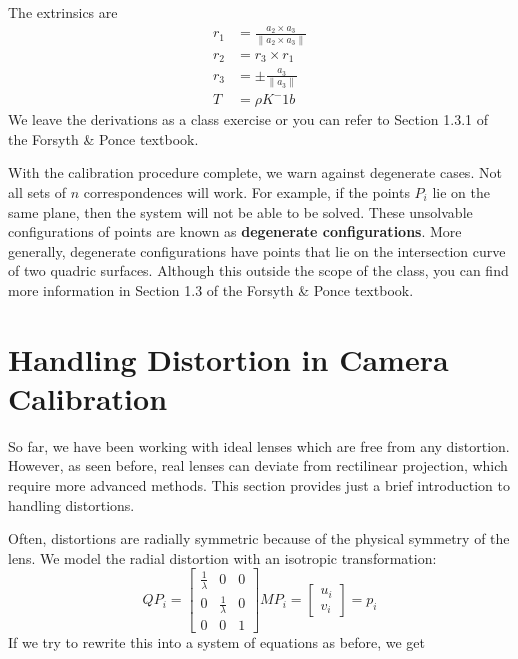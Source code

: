 \documentclass[a4paper, 12pt]{article}
\renewcommand\emph{\textbf}
\begin{document}
The extrinsics are 
\begin{equation}\begin{aligned}
    r_1 &= \frac{a_2\times a_3}{\|a_2\times a_3\|}\\
    r_2 &= r_3\times r_1\\
    r_3 &= \pm \frac{ a_3}{\| a_3\|}\\
    T &= \rho K^-1 b
\end{aligned}\end{equation}
We leave the derivations as a class exercise or you can refer to Section 1.3.1 of the Forsyth \& Ponce textbook.

With the calibration procedure complete, we warn against degenerate cases. Not all sets of $n$ correspondences will work. For example, if the points $P_i$ lie on the same plane, then the system will not be able to be solved. These unsolvable configurations of points are known as \emph{degenerate configurations}. More generally, degenerate configurations have points that lie on the intersection curve of two quadric surfaces. Although this outside the scope of the class, you can find more information in Section 1.3 of the Forsyth \& Ponce textbook. 

\section{Handling Distortion in Camera Calibration}
So far, we have been working with ideal lenses which are free from any distortion. However, as seen before, real lenses can deviate from rectilinear projection, which require more advanced methods. This section provides just a brief introduction to handling distortions. 

Often, distortions are radially symmetric because of the physical symmetry of the lens. We model the radial distortion with an isotropic transformation:
\begin{equation}
    QP_i = \begin{bmatrix}
    \frac{1}{\lambda}&0&0\\0 &    \frac{1}{\lambda} & 0 \\ 0 & 0 &1\end{bmatrix} M P_i = \begin{bmatrix}
    u_i\\v_i\end{bmatrix}
    = p_i
\end{equation}
If we try to rewrite this into a system of equations as before, we get 
\end{document}
